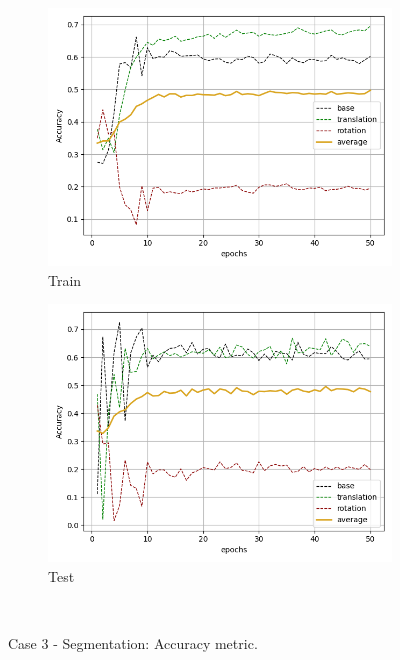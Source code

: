 \begin{figure}[H]
    \begin{subfigure}{.48\linewidth}
    \centering
    \includegraphics[scale=0.45]{Img/seg_flow_nonoise_train_acc.png}
    \caption{Train}
    \end{subfigure}
    \begin{subfigure}{.48\linewidth}
    \centering
    \includegraphics[scale=0.45]{Img/seg_flow_nonoise_test_acc.png}
    \caption{Test}
    \end{subfigure}\\
    \caption{Case 3 - Segmentation: Accuracy metric.}
\end{figure}
